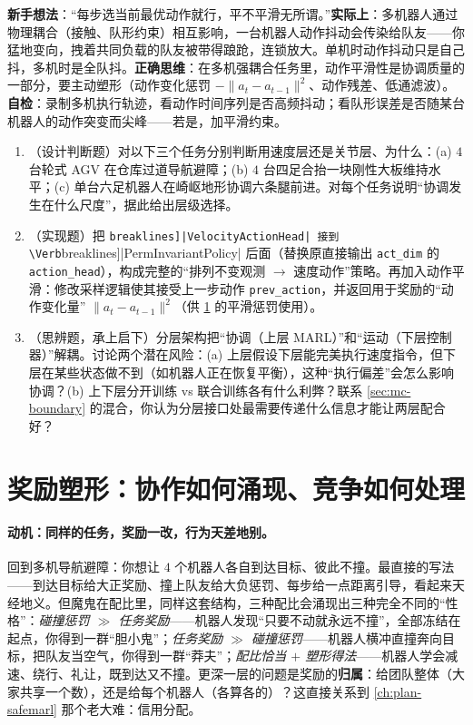 \begin{pitfall}
\textbf{新手想法}：“每步选当前最优动作就行，平不平滑无所谓。”\textbf{实际上}：多机器人通过物理耦合（接触、队形约束）相互影响，一台机器人动作抖动会传染给队友——你猛地变向，拽着共同负载的队友被带得踉跄，连锁放大。单机时动作抖动只是自己抖，多机时是全队抖。\textbf{正确思维}：在多机强耦合任务里，动作平滑性是协调质量的一部分，要主动塑形（动作变化惩罚 $-\|a_t-a_{t-1}\|^2$、动作残差、低通滤波）。\textbf{自检}：录制多机执行轨迹，看动作时间序列是否高频抖动；看队形误差是否随某台机器人的动作突变而尖峰——若是，加平滑约束。
\end{pitfall}

\begin{practice}
\begin{enumerate}
  \item （设计判断题）对以下三个任务分别判断用速度层还是关节层、为什么：(a) $4$ 台轮式 AGV 在仓库过道导航避障；(b) $4$ 台四足合抬一块刚性大板维持水平；(c) 单台六足机器人在崎岖地形协调六条腿前进。对每个任务说明“协调发生在什么尺度”，据此给出层级选择。
  \item （实现题）把 \Verb[breaklines]|VelocityActionHead| 接到 \Verb[breaklines]|PermInvariantPolicy| 后面（替换原直接输出 \verb|act_dim| 的 \verb|action_head|），构成完整的“排列不变观测 $\to$ 速度动作”策略。再加入动作平滑：修改采样逻辑使其接受上一步动作 \verb|prev_action|，并返回用于奖励的“动作变化量” $\|a_t-a_{t-1}\|^2$（供 \cref{sec:mc-reward} 的平滑惩罚使用）。
  \item （思辨题，承上启下）分层架构把“协调（上层 MARL）”和“运动（下层控制器）”解耦。讨论两个潜在风险：(a) 上层假设下层能完美执行速度指令，但下层在某些状态做不到（如机器人正在恢复平衡），这种“执行偏差”会怎么影响协调？(b) 上下层分开训练 vs 联合训练各有什么利弊？联系 \cref{sec:mc-boundary} 的混合，你认为分层接口处最需要传递什么信息才能让两层配合好？
\end{enumerate}
\end{practice}

\section{奖励塑形：协作如何涌现、竞争如何处理}
\label{sec:mc-reward}

\paragraph{动机：同样的任务，奖励一改，行为天差地别。}
回到多机导航避障：你想让 $4$ 个机器人各自到达目标、彼此不撞。最直接的写法——到达目标给大正奖励、撞上队友给大负惩罚、每步给一点距离引导，看起来天经地义。但魔鬼在配比里，同样这套结构，三种配比会涌现出三种完全不同的“性格”：\emph{碰撞惩罚 $\gg$ 任务奖励}——机器人发现“只要不动就永远不撞”，全部冻结在起点，你得到一群“胆小鬼”；\emph{任务奖励 $\gg$ 碰撞惩罚}——机器人横冲直撞奔向目标，把队友当空气，你得到一群“莽夫”；\emph{配比恰当 $+$ 塑形得法}——机器人学会减速、绕行、礼让，既到达又不撞。更深一层的问题是奖励的\textbf{归属}：给团队整体（大家共享一个数），还是给每个机器人（各算各的）？这直接关系到 \cref{ch:plan-safemarl} 那个老大难：信用分配。

